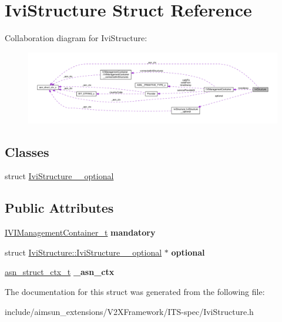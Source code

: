 \hypertarget{structIviStructure}{}\section{Ivi\+Structure Struct Reference}
\label{structIviStructure}


Collaboration diagram for Ivi\+Structure\+:\nopagebreak
\begin{figure}[H]
\begin{center}
\leavevmode
\includegraphics[width=350pt]{structIviStructure__coll__graph}
\end{center}
\end{figure}
\subsection*{Classes}
\begin{DoxyCompactItemize}
\item 
struct \hyperlink{structIviStructure_1_1IviStructure____optional}{Ivi\+Structure\+\_\+\+\_\+optional}
\end{DoxyCompactItemize}
\subsection*{Public Attributes}
\begin{DoxyCompactItemize}
\item 
\hyperlink{structIVIManagementContainer}{I\+V\+I\+Management\+Container\+\_\+t} {\bfseries mandatory}\hypertarget{structIviStructure_afb227a2ce418a35282e537aa77cdb235}{}\label{structIviStructure_afb227a2ce418a35282e537aa77cdb235}

\item 
struct \hyperlink{structIviStructure_1_1IviStructure____optional}{Ivi\+Structure\+::\+Ivi\+Structure\+\_\+\+\_\+optional} $\ast$ {\bfseries optional}\hypertarget{structIviStructure_a5d4623c482fcde1a269a8fe9e5a40de3}{}\label{structIviStructure_a5d4623c482fcde1a269a8fe9e5a40de3}

\item 
\hyperlink{structasn__struct__ctx__s}{asn\+\_\+struct\+\_\+ctx\+\_\+t} {\bfseries \+\_\+asn\+\_\+ctx}\hypertarget{structIviStructure_a56eaea419dc0456d64d5cd4c24dac609}{}\label{structIviStructure_a56eaea419dc0456d64d5cd4c24dac609}

\end{DoxyCompactItemize}


The documentation for this struct was generated from the following file\+:\begin{DoxyCompactItemize}
\item 
include/aimsun\+\_\+extensions/\+V2\+X\+Framework/\+I\+T\+S-\/spec/Ivi\+Structure.\+h\end{DoxyCompactItemize}
